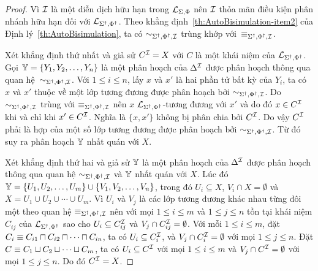 \begin{proof}
Vì $\mathcal{I}$ là một diễn dịch hữu hạn trong $\mathcal{L}_{\Sigma,\Phi}$ nên $\mathcal{I}$ thỏa mãn điều kiện phân nhánh hữu hạn đối với $\mathcal{L}_{\Sigma^\dag,\Phi^\dag}$. Theo khẳng định~\eqref{th:AutoBisimulation-item2} của Định lý~\ref{th:AutoBisimulation}, ta có $\sim_{\Sigma^\dag,\Phi^\dag,\mathcal{I}}$ trùng khớp với~$\equiv_{\Sigma^\dag,\Phi^\dag,\mathcal{I}}$.

\semiItem Xét khẳng định thứ nhất và giả sử $C^{\mathcal{I}} = X$ với $C$ là một khái niệm của $\mathcal{L}_{\Sigma^\dag,\Phi^\dag}$. Gọi $\mathbb{Y} = \{Y_1, Y_2, \ldots, Y_n\}$ là một phân hoạch của $\Delta^{\mathcal{I}}$ được phân hoạch thông qua quan hệ~$\sim_{\Sigma^\dag,\Phi^\dag,\mathcal{I}}$. Với $1 \leq i \leq n$, lấy $x$ và $x'$ là hai phần tử bất kỳ của $Y_i$, ta có $x$ và $x'$ thuộc về một lớp tương đương được phân hoạch bởi $\sim_{\Sigma^\dag,\Phi^\dag,\mathcal{I}}$. Do $\sim_{\Sigma^\dag,\Phi^\dag,\mathcal{I}}$ trùng với $\equiv_{\Sigma^\dag,\Phi^\dag,\mathcal{I}}$ nên $x$ $\mathcal{L}_{\Sigma^\dag,\Phi^\dag}$-tương đương với $x'$ và do đó $x \in C^{\mathcal{I}}$ khi và chỉ khi $x' \in C^{\mathcal{I}}$. Nghĩa là $\{x, x'\}$ không bị phân chia bởi $C^{\mathcal{I}}$. Do vậy $C^{\mathcal{I}}$ phải là hợp của một số lớp tương đương được phân hoạch bởi $\sim_{\Sigma^\dag,\Phi^\dag,\mathcal{I}}$. Từ đó suy ra phân hoạch $\mathbb{Y}$ nhất quán với $X$.

\semiItem Xét khẳng định thứ hai và giả sử $\mathbb{Y}$ là một phân hoạch của $\Delta^{\mathcal{I}}$ được phân hoạch thông qua quan hệ $\sim_{\Sigma^\dag,\Phi^\dag,\mathcal{I}}$ và $\mathbb{Y}$ nhất quán với $X$. Lúc đó $\mathbb{Y} = \{U_1, U_2, \ldots, U_m\} \cup \{V_1, V_2, \ldots, V_{n}\}$, trong đó $U_i \subseteq X$, $V_i \cap X = \emptyset$ và $X = U_1 \cup U_2 \cup \cdots \cup U_{m}$. Vì $U_i$ và $V_j$ là các lớp tương đương khác nhau từng đôi một theo quan hệ $\equiv_{\Sigma^\dag,\Phi^\dag,\mathcal{I}}$ nên với mọi $1 \leq i \leq m$ và $1 \leq j \leq n$ tồn tại khái niệm $C_{ij}$ của $\mathcal{L}_{\Sigma^\dag,\Phi^\dag}$ sao cho $U_i \subseteq C_{ij}^{\mathcal{I}}$ và $V_j \cap C_{ij}^{\mathcal{I}} = \emptyset$. Với mỗi $1 \leq i \leq m$, đặt $C_i \equiv C_{i1} \sqcap C_{i2} \sqcap \cdots \sqcap C_{in}$, ta có $U_i \subseteq C_i^{\mathcal{I}}$, và $V_j \cap C_i^{\mathcal{I}} = \emptyset$ với mọi $1 \leq j \leq n$. Đặt $C \equiv C_1 \sqcup C_2 \sqcup \cdots \sqcup C_m$, ta có $U_i \subseteq C^{\mathcal{I}}$ với mọi $1 \leq i \leq m$ và $V_j \cap C^{\mathcal{I}} = \emptyset$ với mọi $1 \leq j \leq n$. Do đó $C^{\mathcal{I}} = X$.
\end{proof}


